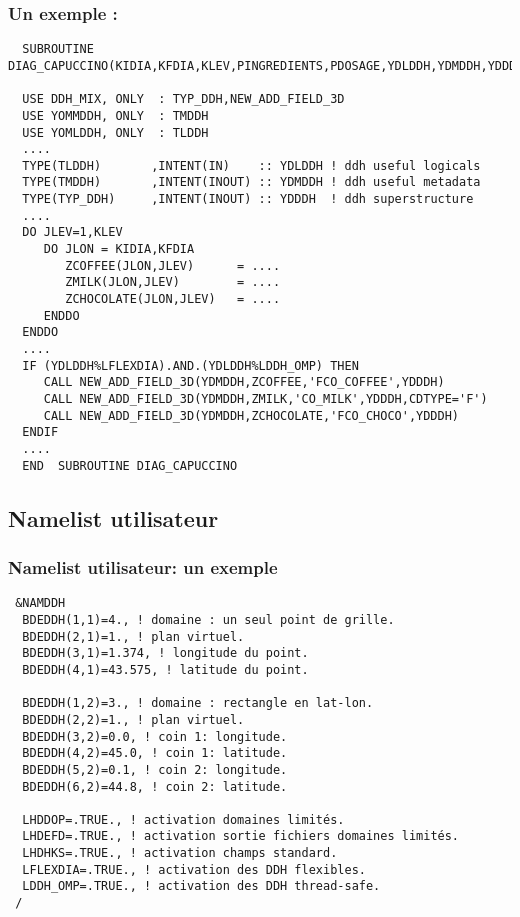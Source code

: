\documentclass[aspectratio=169]{beamer}
\begin{document}
\begin{frame}[fragile]
\frametitle{{\normalsize Un exemple :} }
\vspace*{-0.25cm}
\begin{exampleblock}{}
\begin{tiny}
 \begin{verbatim} 
  SUBROUTINE DIAG_CAPUCCINO(KIDIA,KFDIA,KLEV,PINGREDIENTS,PDOSAGE,YDLDDH,YDMDDH,YDDDH)
  
  USE DDH_MIX, ONLY  : TYP_DDH,NEW_ADD_FIELD_3D
  USE YOMMDDH, ONLY  : TMDDH
  USE YOMLDDH, ONLY  : TLDDH     
  ....
  TYPE(TLDDH)       ,INTENT(IN)    :: YDLDDH ! ddh useful logicals
  TYPE(TMDDH)       ,INTENT(INOUT) :: YDMDDH ! ddh useful metadata 
  TYPE(TYP_DDH)     ,INTENT(INOUT) :: YDDDH  ! ddh superstructure  
  ....
  DO JLEV=1,KLEV
     DO JLON = KIDIA,KFDIA      
        ZCOFFEE(JLON,JLEV)      = .... 
        ZMILK(JLON,JLEV)        = ....
        ZCHOCOLATE(JLON,JLEV)   = ....
     ENDDO
  ENDDO   
  ....
  IF (YDLDDH%LFLEXDIA).AND.(YDLDDH%LDDH_OMP) THEN
     CALL NEW_ADD_FIELD_3D(YDMDDH,ZCOFFEE,'FCO_COFFEE',YDDDH)
     CALL NEW_ADD_FIELD_3D(YDMDDH,ZMILK,'CO_MILK',YDDDH,CDTYPE='F')
     CALL NEW_ADD_FIELD_3D(YDMDDH,ZCHOCOLATE,'FCO_CHOCO',YDDDH)
  ENDIF
  ....
  END  SUBROUTINE DIAG_CAPUCCINO
  \end{verbatim}  
  \end{tiny}
\end{exampleblock}
\end{frame}

\subsection{Namelist utilisateur}

\begin{frame}[fragile]
\frametitle{{\normalsize Namelist utilisateur: un exemple} }
\vspace*{-0.4cm}
\begin{exampleblock}{}
\begin{footnotesize}
\begin{verbatim} 
 &NAMDDH                                                                                            
  BDEDDH(1,1)=4., ! domaine : un seul point de grille.
  BDEDDH(2,1)=1., ! plan virtuel.
  BDEDDH(3,1)=1.374, ! longitude du point.
  BDEDDH(4,1)=43.575, ! latitude du point.

  BDEDDH(1,2)=3., ! domaine : rectangle en lat-lon.
  BDEDDH(2,2)=1., ! plan virtuel.
  BDEDDH(3,2)=0.0, ! coin 1: longitude.
  BDEDDH(4,2)=45.0, ! coin 1: latitude.
  BDEDDH(5,2)=0.1, ! coin 2: longitude.
  BDEDDH(6,2)=44.8, ! coin 2: latitude.

  LHDDOP=.TRUE., ! activation domaines limités.
  LHDEFD=.TRUE., ! activation sortie fichiers domaines limités.
  LHDHKS=.TRUE., ! activation champs standard.
  LFLEXDIA=.TRUE., ! activation des DDH flexibles.
  LDDH_OMP=.TRUE., ! activation des DDH thread-safe.
 /
\end{verbatim}  
\end{footnotesize}
\end{exampleblock}
\end{frame}
\end{document}

